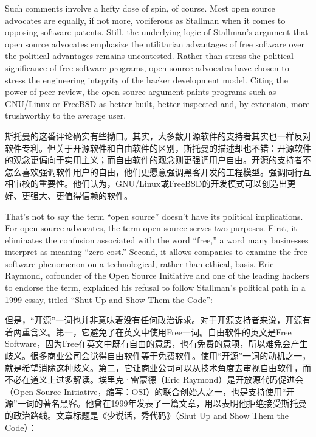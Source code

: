 \ifdefined\eng
Such comments involve a hefty dose of spin, of course. Most open source advocates are equally, if not more, vociferous as Stallman when it comes to opposing software patents. Still, the underlying logic of Stallman's argument-that open source advocates emphasize the utilitarian advantages of free software over the political advantages-remains uncontested. Rather than stress the political significance of free software programs, open source advocates have chosen to stress the engineering integrity of the hacker development model. Citing the power of peer review, the open source argument paints programs such as GNU/Linux or FreeBSD as better built, better inspected and, by extension, more trushworthy to the average user. 
\fi

\ifdefined\chs
斯托曼的这番评论确实有些拗口。其实，大多数开源软件的支持者其实也一样反对软件专利。但关于开源软件和自由软件的区别，斯托曼的描述却也不错：开源软件的观念更偏向于实用主义；而自由软件的观念则更强调用户自由。开源的支持者不怎么喜欢强调软件用户的自由，他们更愿意强调黑客开发的工程模型。强调同行互相审校的重要性。他们认为，GNU/Linux或FreeBSD的开发模式可以创造出更好、更强大、更值得信赖的软件。
\fi

\fi

\ifdefined\vtwo
\ifdefined\eng
That's not to say the term ``open source'' doesn't have its political implications. For open source advocates, the term open source serves two purposes. First, it eliminates the confusion associated with the word ``free,'' a word many businesses interpret as meaning ``zero cost.'' Second, it allows companies to examine the free software phenomenon on a technological, rather than ethical, basis. Eric Raymond, cofounder of the Open Source Initiative and one of the leading hackers to endorse the term, explained his refusal to follow Stallman's political path in a 1999 essay, titled ``Shut Up and Show Them the Code'':
\fi

\ifdefined\chs
但是，``开源''一词也并非意味着没有任何政治诉求。对于开源支持者来说，开源有着两重含义。第一，它避免了在英文中使用Free一词。自由软件的英文是Free Software，因为Free在英文中既有自由的意思，也有免费的意项，所以难免会产生歧义。很多商业公司会觉得自由软件等于免费软件。使用``开源''一词的动机之一，就是希望消除这种歧义。第二，它让商业公司可以从技术角度去审视自由软件，而不必在道义上过多解读。埃里克·雷蒙德（Eric Raymond）是开放源代码促进会（Open Source Initiative，缩写：OSI）的联合创始人之一，也是支持使用``开源''一词的著名黑客。他曾在1999年发表了一篇文章，用以表明他拒绝接受斯托曼的政治路线。文章标题是《少说话，秀代码》（Shut Up and Show Them the Code）：
\fi
\fi

